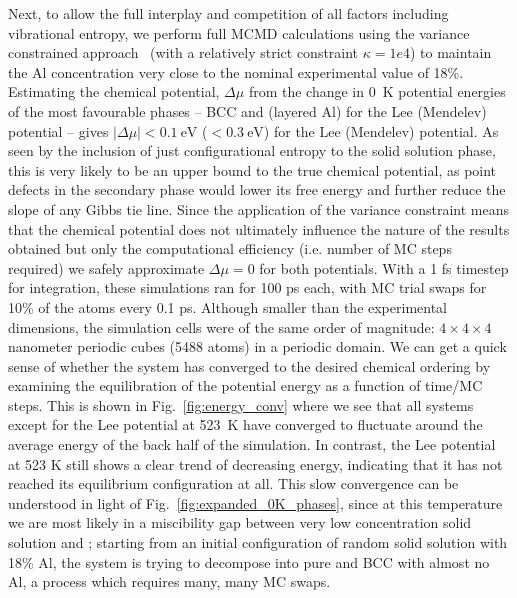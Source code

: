 Next, to allow the full interplay and competition of all factors including vibrational entropy, we perform full MCMD calculations using the variance constrained approach~\cite{sadigh2012calculation, sadigh2012scalable} (with a relatively strict constraint $\kappa = 1e4$) to maintain the Al concentration very close to the nominal experimental value of 18\%.
Estimating the chemical potential, $\Delta \mu$ from the change in 0~K potential energies of the most favourable phases -- BCC and \DOTHREE (layered Al) for the Lee (Mendelev) potential -- gives $|\Delta \mu| < 0.1~\mathrm{eV}$ ($<0.3~\mathrm{eV}$) for the Lee (Mendelev) potential.
As seen by the inclusion of just configurational entropy to the solid solution phase, this is very likely to be an upper bound to the true chemical potential, as point defects in the secondary phase would lower its free energy and further reduce the slope of any Gibbs tie line.
Since the application of the variance constraint means that the chemical potential does not ultimately influence the nature of the results obtained but only the computational efficiency (i.e. number of MC steps required) we safely approximate $\Delta \mu = 0 $ for both potentials.
With a 1 fs timestep for integration, these simulations ran for 100 ps each, with MC trial swaps for 10\% of the atoms every 0.1 ps.
Although smaller than the experimental dimensions, the simulation cells were of the same order of magnitude: $4\times4\times4$ nanometer periodic cubes (5488 atoms) in a periodic domain.
We can get a quick sense of whether the system has converged to the desired chemical ordering by examining the equilibration of the potential energy as a function of time/MC steps.
This is shown in Fig.~\ref{fig:energy_conv} where we see that all systems except for the Lee potential  at 523~K have converged to fluctuate around the average energy of the back half of the simulation.
In contrast, the Lee potential at 523 K still shows a clear trend of decreasing energy, indicating that it has not reached its equilibrium configuration at all.
This slow convergence can be understood in light of Fig.~\ref{fig:expanded_0K_phases}, since at this temperature we are most likely in a miscibility gap between very low concentration solid solution and \DOTHREE;
starting from an initial configuration of random solid solution with 18\% Al, the system is trying to decompose into pure \DOTHREE and BCC with almost no Al, a process which requires many, many MC swaps.
%
